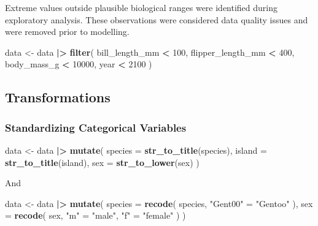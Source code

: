 \documentclass[
]{article}
\newenvironment{Shaded}{\begin{snugshade}}{\end{snugshade}}
\newcommand{\AttributeTok}[1]{\textcolor[rgb]{0.13,0.29,0.53}{#1}}
\newcommand{\DecValTok}[1]{\textcolor[rgb]{0.00,0.00,0.81}{#1}}
\newcommand{\FunctionTok}[1]{\textcolor[rgb]{0.13,0.29,0.53}{\textbf{#1}}}
\newcommand{\NormalTok}[1]{#1}
\newcommand{\OtherTok}[1]{\textcolor[rgb]{0.56,0.35,0.01}{#1}}
\newcommand{\SpecialCharTok}[1]{\textcolor[rgb]{0.81,0.36,0.00}{\textbf{#1}}}
\newcommand{\StringTok}[1]{\textcolor[rgb]{0.31,0.60,0.02}{#1}}
\begin{document}
Extreme values outside plausible biological ranges were identified
during exploratory analysis. These observations were considered data
quality issues and were removed prior to modelling.

\begin{Shaded}
\begin{Highlighting}[]
\NormalTok{data }\OtherTok{\textless{}{-}}\NormalTok{ data }\SpecialCharTok{|\textgreater{}}
  \FunctionTok{filter}\NormalTok{(}
\NormalTok{    bill\_length\_mm }\SpecialCharTok{\textless{}} \DecValTok{100}\NormalTok{,}
\NormalTok{    flipper\_length\_mm }\SpecialCharTok{\textless{}} \DecValTok{400}\NormalTok{,}
\NormalTok{    body\_mass\_g }\SpecialCharTok{\textless{}} \DecValTok{10000}\NormalTok{,}
\NormalTok{    year }\SpecialCharTok{\textless{}} \DecValTok{2100}
\NormalTok{  )}
\end{Highlighting}
\end{Shaded}

\subsection{Transformations}\label{transformations}

\subsubsection{Standardizing Categorical
Variables}\label{standardizing-categorical-variables}

\begin{Shaded}
\begin{Highlighting}[]
\NormalTok{data }\OtherTok{\textless{}{-}}\NormalTok{ data }\SpecialCharTok{|\textgreater{}}
  \FunctionTok{mutate}\NormalTok{(}
    \AttributeTok{species =} \FunctionTok{str\_to\_title}\NormalTok{(species),}
    \AttributeTok{island =} \FunctionTok{str\_to\_title}\NormalTok{(island),}
    \AttributeTok{sex =} \FunctionTok{str\_to\_lower}\NormalTok{(sex)}
\NormalTok{  )}
\end{Highlighting}
\end{Shaded}

And

\begin{Shaded}
\begin{Highlighting}[]
\NormalTok{data }\OtherTok{\textless{}{-}}\NormalTok{ data }\SpecialCharTok{|\textgreater{}}
  \FunctionTok{mutate}\NormalTok{(}
    \AttributeTok{species =} \FunctionTok{recode}\NormalTok{(}
\NormalTok{      species,}
      \StringTok{"Gent00"} \OtherTok{=} \StringTok{"Gentoo"}
\NormalTok{    ),}
    \AttributeTok{sex =} \FunctionTok{recode}\NormalTok{(}
\NormalTok{      sex,}
      \StringTok{"m"} \OtherTok{=} \StringTok{"male"}\NormalTok{,}
      \StringTok{"f"} \OtherTok{=} \StringTok{"female"}
\NormalTok{    )}
\NormalTok{  )}
\end{Highlighting}
\end{Shaded}
\end{document}
